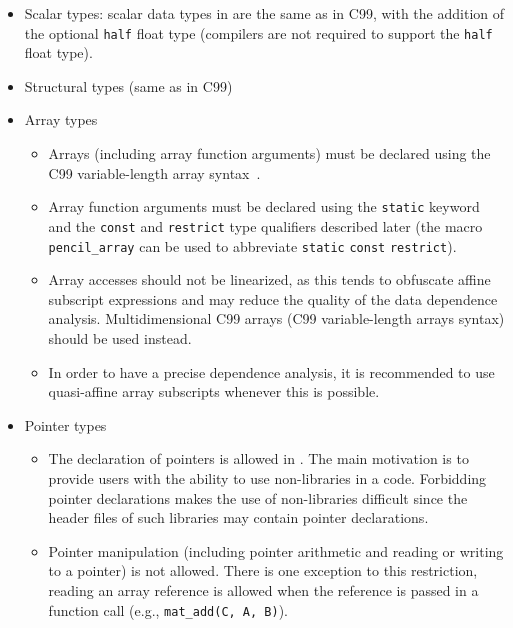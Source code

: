  \begin{itemize}
  \item Scalar types: scalar data types in \pencil are the same as in C99, with the
      addition of the optional \lstinline!half! float type
      (\pencil compilers are not required to support the \lstinline!half!
      float type).
  \item Structural types (same as in C99)
  \item Array types
  \begin{itemize}
    \item Arrays (including array function arguments) must be declared using the C99
      variable-length array syntax~\cite{c99}.
    \item Array function arguments
      must be declared using the \lstinline!static! keyword and
      the \lstinline!const! and \lstinline!restrict! type qualifiers
      described later
      (the macro \lstinline!pencil_array! can be used to
      abbreviate \lstinline!static! \lstinline!const! \lstinline!restrict!).
    \item Array accesses should not be linearized, as this tends to
      obfuscate affine subscript expressions and may reduce the quality of
      the data dependence analysis.
      Multidimensional C99 arrays (C99 variable-length arrays syntax)
      should be used instead.
    \item In order to have a precise dependence analysis, it is recommended
      to use quasi-affine array subscripts
      whenever this is possible.
  \end{itemize}
  \item Pointer types
  \begin{itemize}
    \item The declaration of pointers is allowed in \pencil.
      The main motivation is to provide \pencil users with the ability
      to use non-\pencil libraries in a \pencil code.
      Forbidding pointer declarations makes the use of non-\pencil libraries
      difficult since the header files of such libraries may contain pointer
      declarations.

    \item Pointer manipulation (including pointer arithmetic and reading or
      writing to a pointer) is not allowed.  There is one exception to this
      restriction, reading an array reference is allowed when the reference is
      passed in a function call (e.g., \lstinline!mat_add(C, A, B)!).
      

\end{itemize}
\end{itemize}
